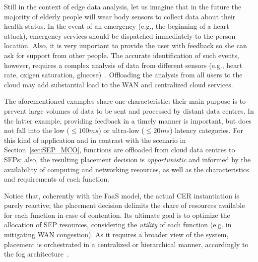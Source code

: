 Still in the context of edge data analysis, 
let us imagine that in the future the majority of elderly people will wear body sensors to collect data about their health status. In the event of an emergency (e.g., the beginning of a heart attack), emergency services should be dispatched immediately to the person location. Also, it is very important to provide the user with feedback so she can ask for support from other people.
The accurate identification of such events, however, requires a complex analysis of data from different sensors (e.g., heart rate, oxigen saturation, glucose)~\cite{Li:2017}. Offloading the analysis from all users to the cloud may add substantial load to the WAN and centralized cloud services. %

 


The aforementioned examples share one characteristic: their main purpose is to prevent large volumes of data to be sent and processed by distant data centres. In the latter example, providing feedback in a timely manner is important, but does not fall into the low ($\leq 100ms$) or ultra-low ($\leq 20ms$) latency categories. For this kind of application and in contrast with the scenario in Section~\ref{sec:SEP_MCO}, functions are offloaded from cloud data centres to SEPs; also, the resulting placement decision is \textit{opportunistic} and informed by the availability of computing and networking resources, as well as the characteristics and requirements of each function. 

Notice that, coherently with the FaaS model, the actual CER instantiation is purely reactive; the placement decision delimits the share of resources available for each function in case of contention.
Its ultimate goal is to optimize the allocation of SEP resources, considering the \textit{utility} of each function (e.g. in mitigating WAN congestion). As it requires a broader view of the system, placement is orchestrated in a centralized or hierarchical manner, accordingly to the fog architecture~\cite{Mach:2017}.  


